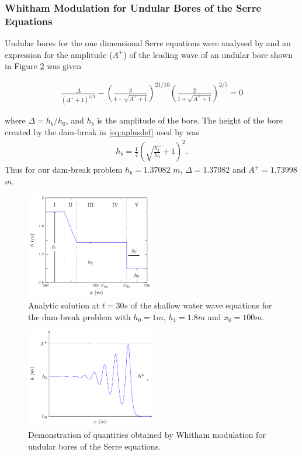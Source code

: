 \documentclass[times]{elsarticle}
\begin{document}
\subsubsection{Whitham Modulation for Undular Bores of the Serre Equations}
Undular bores for the one dimensional Serre equations were analysed by \citet{El-etal-2006} and an expression for the amplitude ($A^+$) of the leading wave of an undular bore shown in Figure \ref{fig:Serreanadiagram} was given
\begin{linenomath*}
	\begin{gather}
	\frac{\Delta}{\left(A^+ + 1\right)^{1/4}} - \left(\frac{3}{4 -  \sqrt{A^+ + 1}}\right)^{21/10} \left(\frac{2}{1 + \sqrt{A^+ + 1}}\right)^{2/5} = 0
	\label{eq:aplusdef}
	\end{gather}
\end{linenomath*}
where $\Delta = h_b / h_0$, and $h_b$ is the amplitude of the bore. The height of the bore created by the dam-break in \eqref{eq:aplusdef} used by \citet{El-etal-2006} was
\begin{gather*}
\label{eqn:hrdef}
h_b = \frac{1}{4}\left(\sqrt{\frac{h_1}{h_0}} + 1\right)^2.
\end{gather*} 
Thus for our dam-break problem $h_b = 1.37082$ $m$, $\Delta = 1.37082$ and  $A^+ = 1.73998$ $m$.

\begin{figure}
	\centering
	\includegraphics[width=0.5\textwidth]{pics/explainers/SWWEana.pdf}
	\caption{Analytic solution at $t=30s$ of the shallow water wave equations for the dam-break problem with $h_0 = 1m$, $h_1=1.8m$ and $x_0=100m$.}
	\label{fig:SWWEanadiagram}
\end{figure}

\begin{figure}
	\centering
	\includegraphics[width=0.5\textwidth]{pics/explainers/SERREex.pdf}
	\caption{Demonstration of quantities obtained by Whitham modulation for undular bores of the Serre equations.}
	\label{fig:Serreanadiagram}
\end{figure}
\end{document}

